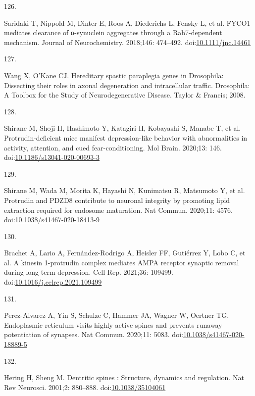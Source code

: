 \documentclass[
  12pt,
  a4paper,
]{book}
\newlength{\cslhangindent}
\newlength{\csllabelwidth}
\newenvironment{CSLReferences}[2] %
 {\begin{list}{}{%
  \setlength{\itemindent}{0pt}
  \setlength{\leftmargin}{0pt}
  \setlength{\parsep}{0pt}
  \ifodd #1
   \setlength{\leftmargin}{\cslhangindent}
   \setlength{\itemindent}{-1\cslhangindent}
  \fi
  \setlength{\itemsep}{#2\baselineskip}}}
 {\end{list}}
\newcommand{\CSLLeftMargin}[1]{\parbox[t]{\csllabelwidth}{\strut#1\strut}}
\newcommand{\CSLRightInline}[1]{\parbox[t]{\linewidth - \csllabelwidth}{\strut#1\strut}}
\begin{document}
\begin{CSLReferences}{0}{1}
\CSLLeftMargin{126. }%
\CSLRightInline{Saridaki T, Nippold M, Dinter E, Roos A, Diederichs L, Fensky L, et al. {FYCO1} mediates clearance of α-synuclein aggregates through a {Rab7-dependent} mechanism. Journal of Neurochemistry. 2018;146: 474--492. doi:\href{https://doi.org/10.1111/jnc.14461}{10.1111/jnc.14461}}

\CSLLeftMargin{127. }%
\CSLRightInline{Wang X, O'Kane CJ. Hereditary spastic paraplegia genes in {Drosophila}: Dissecting their roles in axonal degeneration and intracellular traffic. Drosophila: {A Toolbox} for the {Study} of {Neurodegenerative Disease}. {Taylor \& Francis}; 2008. }

\CSLLeftMargin{128. }%
\CSLRightInline{Shirane M, Shoji H, Hashimoto Y, Katagiri H, Kobayashi S, Manabe T, et al. Protrudin-deficient mice manifest depression-like behavior with abnormalities in activity, attention, and cued fear-conditioning. Mol Brain. 2020;13: 146. doi:\href{https://doi.org/10.1186/s13041-020-00693-3}{10.1186/s13041-020-00693-3}}

\CSLLeftMargin{129. }%
\CSLRightInline{Shirane M, Wada M, Morita K, Hayashi N, Kunimatsu R, Matsumoto Y, et al. Protrudin and {PDZD8} contribute to neuronal integrity by promoting lipid extraction required for endosome maturation. Nat Commun. 2020;11: 4576. doi:\href{https://doi.org/10.1038/s41467-020-18413-9}{10.1038/s41467-020-18413-9}}

\CSLLeftMargin{130. }%
\CSLRightInline{Brachet A, Lario A, Fernández-Rodrigo A, Heisler FF, Gutiérrez Y, Lobo C, et al. A kinesin 1-protrudin complex mediates {AMPA} receptor synaptic removal during long-term depression. Cell Rep. 2021;36: 109499. doi:\href{https://doi.org/10.1016/j.celrep.2021.109499}{10.1016/j.celrep.2021.109499}}

\CSLLeftMargin{131. }%
\CSLRightInline{Perez-Alvarez A, Yin S, Schulze C, Hammer JA, Wagner W, Oertner TG. Endoplasmic reticulum visits highly active spines and prevents runaway potentiation of synapses. Nat Commun. 2020;11: 5083. doi:\href{https://doi.org/10.1038/s41467-020-18889-5}{10.1038/s41467-020-18889-5}}

\CSLLeftMargin{132. }%
\CSLRightInline{Hering H, Sheng M. Dentritic spines : Structure, dynamics and regulation. Nat Rev Neurosci. 2001;2: 880--888. doi:\href{https://doi.org/10.1038/35104061}{10.1038/35104061}}


\end{CSLReferences}
\end{document}
